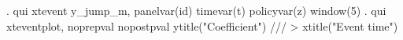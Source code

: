 . qui xtevent y_jump_m, panelvar(id) timevar(t) policyvar(z) window(5) 
{\smallskip}
. qui xteventplot, noprepval nopostpval ytitle("Coefficient") ///
>         xtitle("Event time")
{\smallskip}
